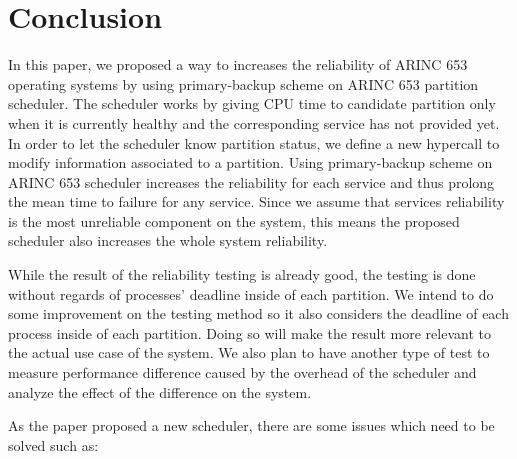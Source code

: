 \section{Conclusion}

In this paper, we proposed a way to increases the reliability of ARINC 653 operating systems by
using primary-backup scheme on ARINC 653 partition scheduler. The scheduler works by giving CPU
time to candidate partition only when it is currently healthy and the corresponding service has
not provided yet. In order to let the scheduler know partition status, we define a new hypercall
to modify information associated to a partition. Using primary-backup scheme on ARINC 653
scheduler increases the reliability for each service and thus prolong the mean time to failure
for any service. Since we assume that services reliability is the most unreliable component on the
system, this means the proposed scheduler also increases the whole system reliability.

While the result of the reliability testing is already good, the testing is done without regards
of processes' deadline inside of each partition. We intend to do some improvement on the testing
method so it also considers the deadline of each process inside of each partition. Doing so will
make the result more relevant to the actual use case of the system. We also plan to have
another type of test to measure performance difference caused by the overhead of the scheduler
and analyze the effect of the difference on the system.

As the paper proposed a new scheduler, there are some issues which need to be solved such as:

